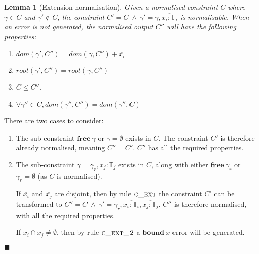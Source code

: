 \documentclass[preprint]{sigplanconf}
\newtheorem{lem}{Lemma}
\newcommand{\cand}{\:\wedge\:}
\newcommand{\free}[1]{\mathbf{free}\:#1}
\newcommand{\tinf}{\mathbb{T}}
\newcommand{\qed}{$\blacksquare$}
\newenvironment{proof}{\vspace{1ex}\noindent{\bf Proof}\hspace{0.5em}}
  {\hfill\qed\vspace{1ex}}
\begin{document}

\begin{lem}[Extension normalisation]
\label{lem:norm_ext}
Given a normalised constraint $C$ where $\gamma \in C$ and $\gamma' \notin C$, 
the constraint $C' = C \cand \gamma' = \gamma, \overline{x_i : \tinf_i}$
is normalisable. When an error is not generated, the normalised output
$C''$ will have the following properties:

\begin{enumerate}
\item $dom(\gamma', C'') = dom(\gamma, C'') + \overline{x_i}$
\item $root(\gamma', C'') = root(\gamma, C'')$
\item $C \leq C''$.
\item $\forall \gamma'' \in C, dom(\gamma'', C'') = dom(\gamma'', C)$
\end{enumerate}

\end{lem}
\begin{proof}
There are two cases to consider:

\begin{enumerate}
\item The sub-constraint $\free{\gamma}$ or $\gamma = \emptyset$ exists in $C$.
The constraint $C'$ is therefore already normalised, meaning $C'' = C'$.
$C''$ has all the required properties.

\item The sub-constraint $\gamma = \gamma_r, \overline{x_j : \tinf_j}$ exists
in $C$, along with either $\free{\gamma_r}$ or $\gamma_r = \emptyset$ (as
$C$ is normalised).

If $\overline{x_i}$ and $\overline{x_j}$ are disjoint, then by rule
$\textsc{c\_ext}$ the constraint $C'$ can be transformed to
$C'' = C \cand \gamma' = \gamma_r, \overline{x_i : \tinf_i}, \overline{x_j : \tinf_j}$.
$C''$ is therefore normalised, with all the required properties.

If $\overline{x_i} \cap \overline{x_j} \neq \emptyset$, then by rule
$\textsc{c\_ext\_2}$ a $\mathbf{bound}\:x$ error will be generated.
\end{enumerate}
\end{proof}


\end{document}
